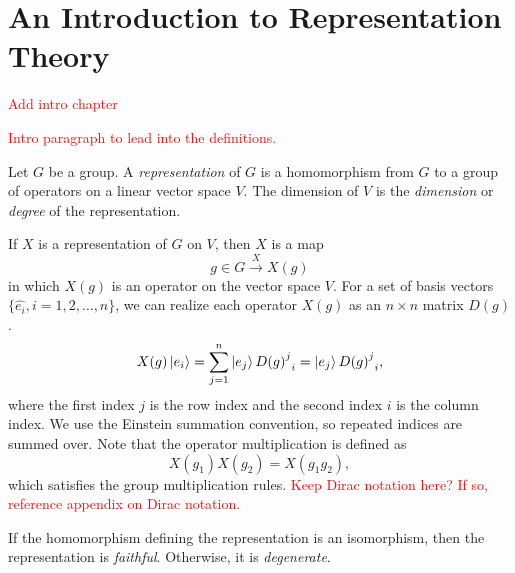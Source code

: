 \chapter{An Introduction to Representation Theory}\label{ch:rep_background}


\textcolor{red}{Add intro chapter}

\textcolor{red}{Intro paragraph to lead into the definitions.}

\begin{definition}
    Let $G$ be a group. A \textit{representation} of $G$ is a homomorphism from $G$ to a group of operators on a linear vector space $V$. The dimension of $V$ is the \textit{dimension} or \textit{degree} of the representation.
\end{definition}

If $X$ is a representation of $G$ on $V$, then $X$ is a map
\begin{equation}
    g\in G\xrightarrow{X} X(g)
\end{equation}
in which $X(g)$ is an operator on the vector space $V$. For a set of basis vectors $\{\hat{e_i},i=1,2,\dots,n\}$, we can realize each operator $X(g)$ as an $n\times n$ matrix $D(g)$.
\begin{equation}
    X(g)\ket{e_i} = \sum_{j=1}^n \ket{e_j}{{D(g)}^j}_i = \ket{e_j}{{D(g)}^j}_i,
\end{equation}
where the first index $j$ is the row index and the second index $i$ is the column index. We use the Einstein summation convention, so repeated indices are summed over. Note that the operator multiplication is defined as
\begin{equation}
    X(g_1)X(g_2) = X(g_1g_2),
\end{equation}
which satisfies the group multiplication rules. \textcolor{red}{Keep Dirac notation here? If so, reference appendix on Dirac notation.}

\begin{definition}
    If the homomorphism defining the representation is an isomorphism, then the representation is \textit{faithful}. Otherwise, it is \textit{degenerate}.
\end{definition}

